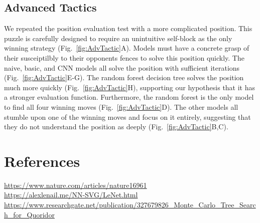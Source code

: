 \documentclass[10pt]{article}
\begin{document}
\subsection{Advanced Tactics}

We repeated the position evaluation test with a more complicated position. This puzzle is carefully designed to require an unintuitive self-block as the only winning strategy (Fig.~\ref{fig:AdvTactic}A). Models must have a concrete grasp of their susceiptilbly to their opponents fences to solve this position quickly. The naive, basic, and CNN models all solve the position with sufficient iterations (Fig.~\ref{fig:AdvTactic}E-G). The random forest decision tree solves the position much more quickly (Fig.~\ref{fig:AdvTactic}H), supporting our hypothesis that it has a stronger evaluation function. Furthermore, the random forest is the only model to find all four winning moves (Fig.~\ref{fig:AdvTactic}D). The other models all stumble upon one of the winning moves and focus on it entirely, suggesting that they do not understand the position as deeply (Fig.~\ref{fig:AdvTactic}B,C).

\section{References}
\url{https://www.nature.com/articles/nature16961}
\\\url{https://alexlenail.me/NN-SVG/LeNet.html}
\\\url{https://www.researchgate.net/publication/327679826_Monte_Carlo_Tree_Search_for_Quoridor}
\end{document}
